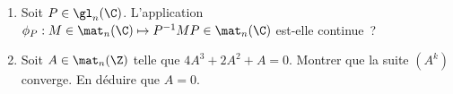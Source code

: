 \begin{enonce}
\begin{exercise}[ID={RMS124 E1227 ENSAM PSI},subtitle={},tags={}]
\begin{enumerate}
  \item Soit $P\in\gl_n(\C)$.
    L'application $\phi_P : M\in\mat_n(\C) \mapsto P^{-1}MP\in\mat_n(\C)$ est-elle continue~?
  \item Soit $A\in\mat_n(\Z)$ telle que $4A^3+2A^2+A=0$.
    Montrer que la suite $\left( A^k \right)$ converge.
    En déduire que $A=0$.
\end{enumerate}
\end{exercise}
\begin{solution}
\end{solution}
\end{enonce}
